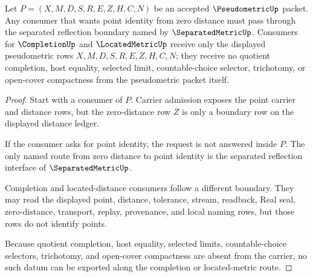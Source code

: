 \begin{theorem}
\label{thm:pseudometric-separated-reflection-handoff}
Let $P=(X,M,D,S,R,E,Z,H,C,N)$ be an accepted $\PseudometricUp$ packet. Any consumer that wants point identity from zero distance must pass through the separated reflection boundary named by $\SeparatedMetricUp$. Consumers for $\CompletionUp$ and $\LocatedMetricUp$ receive only the displayed pseudometric rows $X,M,D,S,R,E,Z,H,C,N$; they receive no quotient completion, host equality, selected limit, countable-choice selector, trichotomy, or open-cover compactness from the pseudometric packet itself.
\end{theorem}
\begin{proof}
Start with a consumer of $P$. Carrier admission exposes the point carrier and distance rows, but the zero-distance row $Z$ is only a boundary row on the displayed distance ledger.

If the consumer asks for point identity, the request is not answered inside $P$. The only named route from zero distance to point identity is the separated reflection interface of $\SeparatedMetricUp$.

Completion and located-distance consumers follow a different boundary. They may read the displayed point, distance, tolerance, stream, readback, Real seal, zero-distance, transport, replay, provenance, and local naming rows, but those rows do not identify points.

Because quotient completion, host equality, selected limits, countable-choice selectors, trichotomy, and open-cover compactness are absent from the carrier, no such datum can be exported along the completion or located-metric route.
\end{proof}

